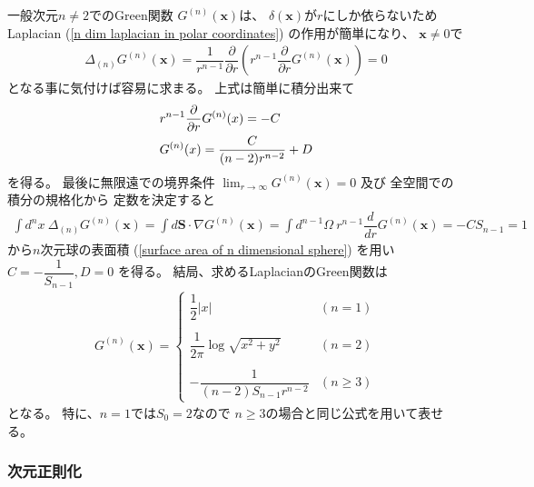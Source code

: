 一般次元$n \neq 2$でのGreen関数
$G^{(n)}(\bm{x})$は、
$\delta(\bm{x})$が$r$にしか依らないため
Laplacian
(\ref{n dim laplacian in polar coordinates})
の作用が簡単になり、
$\bm{x} \neq 0$で
\begin{align}
    \Delta_{(n)}
    G^{(n)}(\bm{x})
=
    \dfrac{1}{r^{n-1}}
    \dfrac{\partial}{\partial r}
    \left(
        r^{n-1}
        \dfrac{\partial}{\partial r}
        G^{(n)}(\bm{x})
    \right)
= 0
\end{align}
となる事に気付けば容易に求まる。
上式は簡単に積分出来て
\begin{align}
    &r^{n-1}
    \dfrac{\partial}{\partial r}
    G^{(n)}(x)
=
    - C
\notag\\
    &G^{(n)}(x)
=
    \dfrac{C}{(n - 2) r^{n-2}}
    + D
\label{n dim green func of laplace (const unfixed)}
\end{align}
を得る。
最後に無限遠での境界条件
$\lim_{r \to \infty}
    G^{(n)}(\bm{x}) = 0$
及び
全空間での積分の規格化から
定数を決定すると
\begin{align}
    \int d^n x\ 
    \Delta_{(n)}
    G^{(n)}(\bm{x})
=
    \int d \bm{S}
        \cdot
        \nabla
    G^{(n)}(\bm{x})
=
    \int d^{n-1} \Omega\ 
        r^{n-1}
        \dfrac{d}{dr}
    G^{(n)}(\bm{x})
=
    - C S_{n-1}
=    1
\end{align}
から$n$次元球の表面積
(\ref{surface area of n dimensional sphere})
を用い
$C = - \dfrac{1}{S_{n-1}}, D = 0$
を得る。
結局、求めるLaplacianのGreen関数は
\begin{align}
    G^{(n)}(\bm{x})
=
    \begin{cases}
        \dfrac{1}{2}|x|
    &(n = 1)
    \\
    \\
        \dfrac{1}{2 \pi}
        \log \sqrt{x^2 + y^2}    
    &(n = 2)
    \\
    \\
        -
        \dfrac{1}{
            (n - 2) S_{n-1} r^{n-2}
        }
    &(n \ge 3)
    \end{cases}
\label{green function of n dim laplacian}
\end{align}
となる。
特に、$n = 1$では$S_0 = 2$なので
$n \ge 3$の場合と同じ公式を用いて表せる。

\subsubsection{次元正則化}

